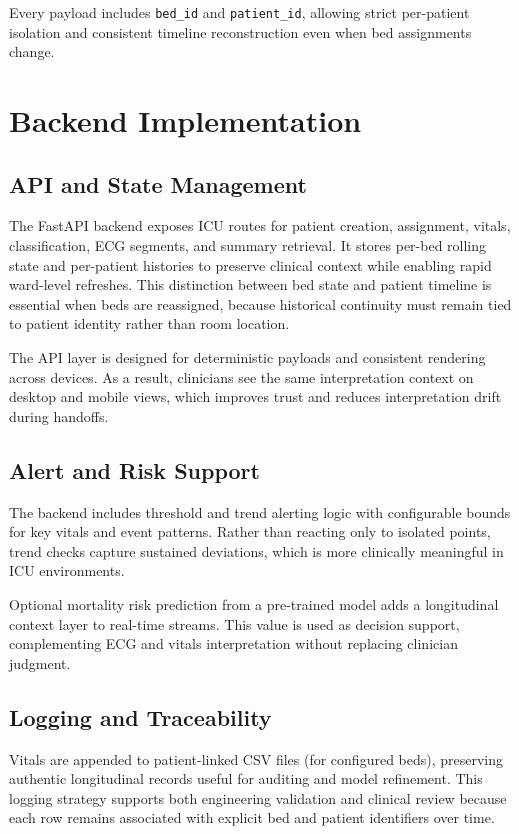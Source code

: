 \documentclass[12pt,a4paper]{article}
\begin{document}
Every payload includes \texttt{bed\_id} and \texttt{patient\_id}, allowing strict per-patient isolation and consistent timeline reconstruction even when bed assignments change.

\section{Backend Implementation}

\subsection{API and State Management}

The FastAPI backend exposes ICU routes for patient creation, assignment, vitals, classification, ECG segments, and summary retrieval. It stores per-bed rolling state and per-patient histories to preserve clinical context while enabling rapid ward-level refreshes. This distinction between bed state and patient timeline is essential when beds are reassigned, because historical continuity must remain tied to patient identity rather than room location.

The API layer is designed for deterministic payloads and consistent rendering across devices. As a result, clinicians see the same interpretation context on desktop and mobile views, which improves trust and reduces interpretation drift during handoffs.

\subsection{Alert and Risk Support}

The backend includes threshold and trend alerting logic with configurable bounds for key vitals and event patterns. Rather than reacting only to isolated points, trend checks capture sustained deviations, which is more clinically meaningful in ICU environments.

Optional mortality risk prediction from a pre-trained model adds a longitudinal context layer to real-time streams. This value is used as decision support, complementing ECG and vitals interpretation without replacing clinician judgment.

\subsection{Logging and Traceability}

Vitals are appended to patient-linked CSV files (for configured beds), preserving authentic longitudinal records useful for auditing and model refinement. This logging strategy supports both engineering validation and clinical review because each row remains associated with explicit bed and patient identifiers over time.
\end{document}
